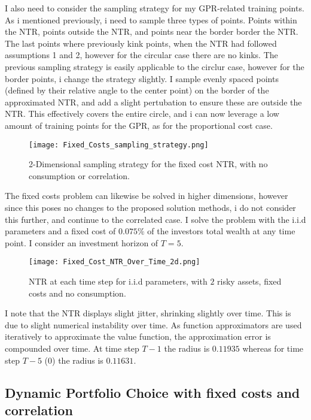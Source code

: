 \documentclass[11pt]{article}
\begin{document}
I also need to consider the sampling strategy for my \ac{GPR}-related training points. As i mentioned previously, i need to sample three types of points.
Points within the \ac{NTR}, points outside the \ac{NTR}, and points near the border border the \ac{NTR}. The last points where previously kink points,
when the NTR had followed assumptions 1 and 2, however for the circular case there are no kinks.
The previous sampling strategy is easily applicable to the circlur case, however for the border points, i change the strategy slightly.
I sample evenly spaced points (defined by their relative angle to the center point) on the border of the approximated \ac{NTR}, and add a slight pertubation to ensure these are outside the NTR.
This effectively covers the entire circle, and i can now leverage a low amount of training points for the GPR, as for the proportional cost case.
\begin{figure}[!ht]
    \centering
    \texttt{[image: Fixed\_Costs\_sampling\_strategy.png]}
    \caption{2-Dimensional sampling strategy for the fixed cost NTR, with no consumption or correlation.}
    \label{fig:Sample_Strategy_Fixed}
\end{figure}
The fixed costs problem can likewise be solved in higher dimensions, however since this poses no changes to the proposed solution methods,
i do not consider this further, and continue to the correlated case.
I solve the problem with the i.i.d parameters and a fixed cost of $0.075\%$ of the investors total wealth at any time point. I consider an investment horizon of $T = 5$.
\begin{figure}[!ht]
    \centering
    \texttt{[image: Fixed\_Cost\_NTR\_Over\_Time\_2d.png]}
    \caption{NTR at each time step for i.i.d parameters, with $2$ risky assets, fixed costs and no consumption.}
    \label{fig:NTR_2d_iid_over_time}
\end{figure}
I note that the NTR displays slight jitter, shrinking slightly over time. This is due to slight numerical instability over time. As function approximators
are used iteratively to approximate the value function, the approximation error is compounded over time. At time step $T-1$ the radius is $0.11935$ whereas for time step $T-5$ ($0$) the radius is $0.11631$.


\subsection{Dynamic Portfolio Choice with fixed costs and correlation}
\end{document}
